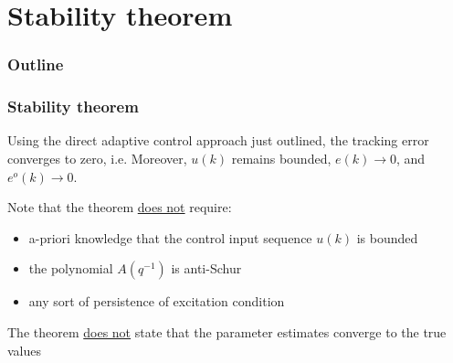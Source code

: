\section{Stability theorem}
\begin{frame}
    \frametitle{Outline}
    \tableofcontents[currentsection]
\end{frame}

\begin{frame}
    \frametitle{Stability theorem}

    Using the direct adaptive control approach just outlined, the tracking error converges to zero, i.e.
    Moreover, $u(k)$ remains bounded, $e(k) \longrightarrow 0$, and $e^o(k)\longrightarrow 0$.
    \pause

    Note that the theorem \underline{does not} require:
    \begin{itemize}
        \item
        a-priori knowledge that the control input sequence $u(k)$ is bounded

        \item
        the polynomial $A(q^{-1})$ is anti-Schur

        \item
        any sort of persistence of excitation condition
    \end{itemize}
    \pause

    The theorem \underline{does not} state that the parameter estimates converge to the true values
\end{frame} 